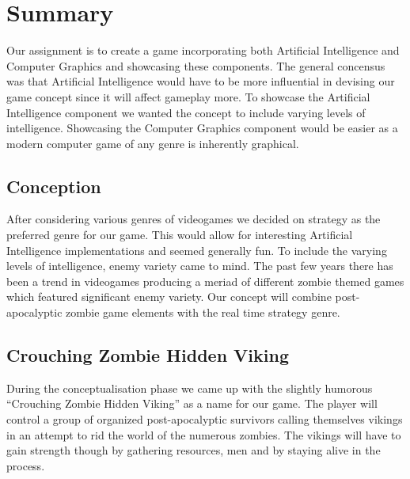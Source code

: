 \chapter{Summary}

Our assignment is to create a game incorporating both Artificial Intelligence and Computer Graphics and showcasing these components. The general concensus was that Artificial Intelligence would have to be more influential in devising our game concept since it will affect gameplay more. To showcase the Artificial Intelligence component we wanted the concept to include varying levels of intelligence. Showcasing the Computer Graphics component would be easier as a modern computer game of any genre is inherently graphical.

\section{Conception}

After considering various genres of videogames we decided on strategy as the preferred genre for our game. This would allow for interesting Artificial Intelligence implementations and seemed generally fun. To include the varying levels of intelligence, enemy variety came to mind. The past few years there has been a trend in videogames producing a meriad of different zombie themed games which featured significant enemy variety. Our concept will combine  post-apocalyptic zombie game  elements with the real time strategy genre.

\section{Crouching Zombie Hidden Viking}

During the conceptualisation phase we came up with the slightly humorous ``Crouching Zombie Hidden Viking'' as a name for our game. The player will control a group of organized post-apocalyptic survivors calling themselves vikings in an attempt to rid the world of the numerous zombies. The vikings will have to gain strength though by gathering resources, men and by staying alive in the process.

